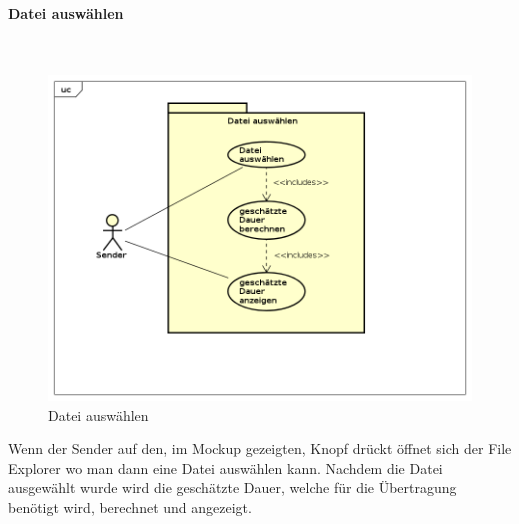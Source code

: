\paragraph{Datei auswählen}\mbox{}\\
\begin{figure}[H]
	\centering
	\includegraphics[width= 0.9\linewidth]{diagramms/useCase/datei_auswaehlen.png}
	\caption{Datei auswählen}
\end{figure}
Wenn der Sender auf den, im Mockup gezeigten, Knopf drückt öffnet sich der File Explorer wo man dann eine Datei auswählen kann. Nachdem die Datei ausgewählt wurde wird die geschätzte Dauer, welche für die Übertragung benötigt wird, berechnet und angezeigt.
\newpage
